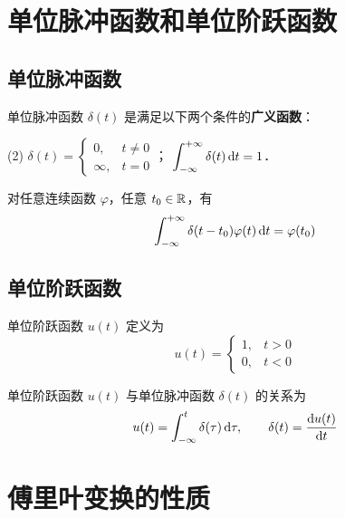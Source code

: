 \documentclass[12pt, a4paper, oneside, UTF8]{ctexbook}
\begin{document}
\section{单位脉冲函数和单位阶跃函数}

\subsection{单位脉冲函数}

\begin{definition}
    单位脉冲函数 $\delta(t)$ 是满足以下两个条件的\textbf{广义函数}：
    \begin{tasks}[label=\roman*.](2)
        \task $\displaystyle\delta(t) = \begin{cases}0, & t\neq 0\\ \infty, & t = 0\end{cases}$；
        \task $\displaystyle\int_{-\infty}^{+\infty}\delta(t)\,\mathrm{d} t = 1$．
    \end{tasks}
\end{definition}

\begin{theorem}
    对任意连续函数 $\varphi$，任意 $t_0\in\mathbb{R}$，有
    \[
        \int_{-\infty}^{+\infty}\delta(t-t_0)\varphi(t)\,\mathrm{d} t = \varphi(t_0)
    \]
\end{theorem}

\subsection{单位阶跃函数}
\begin{definition}[单位阶跃函数]
    单位阶跃函数 $u(t)$ 定义为
    \[
        u(t) = \begin{cases}
            1, & t>0\\
            0, & t<0
        \end{cases}
    \]
\end{definition}

\begin{theorem}
    单位阶跃函数 $u(t)$ 与单位脉冲函数 $\delta(t)$ 的关系为
    \[
        u(t) = \int_{-\infty}^{t}\delta(\tau)\,\mathrm{d}\tau,\qquad
        \delta(t) = \frac{\mathrm{d} u(t)}{\mathrm{d} t}
    \]
\end{theorem}

\section{傅里叶变换的性质}
\end{document}
